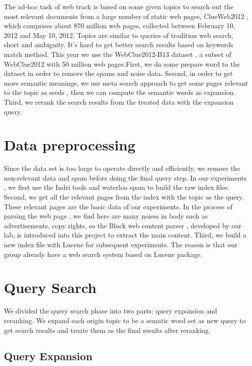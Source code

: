 \documentclass[runningheads,a4paper]{llncs}
\begin{document}
The ad-hoc task of web track is based on some given topics to search out the most relevant documents from a large number of static web pages, ClueWeb2012 \cite{clueweb2012}, which comprises about 870 million web pages, collected between February 10, 2012 and May 10, 2012. Topics are similar to queries of tradition web search, short and ambiguity. It's hard to get better search results based on keywords match method. This year we use the WebClue2012-B13 dataset , a subset of WebClue2012 with 50 million web pages.First, we do some prepare word to the dataset in order to remove the spams and noise data. Second, in order to get more semantic meanings, we use meta search approach to get some pages relevant to the topic as seeds , then we can compute the semantic words as expansion. Third, we rerank the search results from the treated data with the expansion query. 

\section{Data preprocessing}

Since the data set is too large to operate directly and efficiently, we remove the non-relevant  data and spam before doing the final query step. In our experiments , we first use the Indri \cite{indri} tools and waterloo spam \cite{2011-Cormack-p441-465} to build the raw index files. Second, we get all the relevant pages from the index with the topic as the query. These relevant pages are the basic data of our experiments. In the process of parsing the web page , we find here are many noises    in body such as advertisements, copy rights, so the Block web content parser \cite{2012-Lin-p256-264} , developed by our lab,  is introduced into this project to extract the main content. Third, we build a new index file with Lucene \cite{lucene} for subsequent experiments.  The reason is that our group already have a web search system based on Lucene package.

\section{Query Search}

We divided the query search phase into two parts: query expansion and reranking. We expand each origin topic to be a sematic word set as new query to get search results and treate them as the final results after reranking. 

\subsection{Query Expansion }
\end{document}
